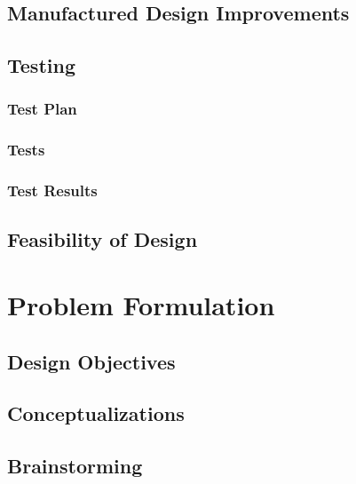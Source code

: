 \documentclass{article}
\begin{document}
\subsection{Manufactured Design Improvements}


\newpage

\subsection{Testing}
\subsubsection{Test Plan}


\newpage

\subsubsection{Tests}


\subsubsection{Test Results}


\subsection{Feasibility of Design} %


\newpage
\appendix
\appendixpage

\section{Problem Formulation}
\subsection{Design Objectives}


\subsection{Conceptualizations}

\subsection{Brainstorming}

\end{document}
